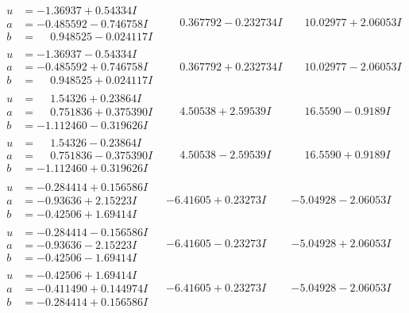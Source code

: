 \documentclass[1p]{elsarticle_modified}
\theoremstyle{definition}
\begin{document}
$$\begin{array}{c|c|c}
\begin{aligned}
u &= -1.36937 + 0.54334 I \\
a &= -0.485592 - 0.746758 I \\
b &= \phantom{-}0.948525 - 0.024117 I\end{aligned}
 & \phantom{-}0.367792 - 0.232734 I & \phantom{-}10.02977 + 2.06053 I \\ \hline\begin{aligned}
u &= -1.36937 - 0.54334 I \\
a &= -0.485592 + 0.746758 I \\
b &= \phantom{-}0.948525 + 0.024117 I\end{aligned}
 & \phantom{-}0.367792 + 0.232734 I & \phantom{-}10.02977 - 2.06053 I \\ \hline\begin{aligned}
u &= \phantom{-}1.54326 + 0.23864 I \\
a &= \phantom{-}0.751836 + 0.375390 I \\
b &= -1.112460 - 0.319626 I\end{aligned}
 & \phantom{-}4.50538 + 2.59539 I & \phantom{-}16.5590 - 0.9189 I \\ \hline\begin{aligned}
u &= \phantom{-}1.54326 - 0.23864 I \\
a &= \phantom{-}0.751836 - 0.375390 I \\
b &= -1.112460 + 0.319626 I\end{aligned}
 & \phantom{-}4.50538 - 2.59539 I & \phantom{-}16.5590 + 0.9189 I \\ \hline\begin{aligned}
u &= -0.284414 + 0.156586 I \\
a &= -0.93636 + 2.15223 I \\
b &= -0.42506 + 1.69414 I\end{aligned}
 & -6.41605 + 0.23273 I & -5.04928 - 2.06053 I \\ \hline\begin{aligned}
u &= -0.284414 - 0.156586 I \\
a &= -0.93636 - 2.15223 I \\
b &= -0.42506 - 1.69414 I\end{aligned}
 & -6.41605 - 0.23273 I & -5.04928 + 2.06053 I \\ \hline\begin{aligned}
u &= -0.42506 + 1.69414 I \\
a &= -0.411490 + 0.144974 I \\
b &= -0.284414 + 0.156586 I\end{aligned}
 & -6.41605 + 0.23273 I & -5.04928 - 2.06053 I \\ \hline\begin{aligned}

\end{aligned}
\end{array}$$
\end{document}
